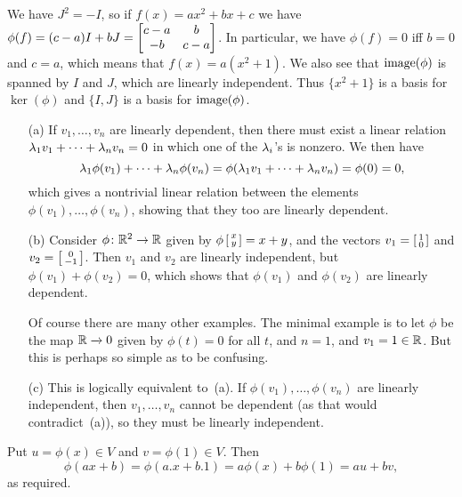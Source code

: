  We have $J^2=-I$, so if $f(x)=ax^2+bx+c$ we have
 $\phi(f)=(c-a)I+bJ=\left[\begin{matrix} c-a&b\\-b&c-a\end{matrix}\right]$.  In particular,
 we have $\phi(f)=0$ iff $b=0$ and $c=a$, which means that
 $f(x)=a(x^2+1)$.  We also see that $\operatorname{image}(\phi)$ is spanned
 by $I$ and $J$, which are linearly independent.  Thus
 $\{x^2+1\}$ is a basis for $\ker(\phi)$ and $\{I,J\}$ is a
 basis for $\operatorname{image}(\phi)$.
\EndDeferredSolution

 \begin{itemize}
  \item[(a)] If $v_1,\dotsc,v_n$ are linearly dependent,
   then there must exist a linear relation
   $\lambda_1v_1+\dotsb+\lambda_nv_n=0$ in which one of the
   $\lambda_i$'s is nonzero.  We then have
   \[ \lambda_1\phi(v_1)+\dotsb+\lambda_n\phi(v_n) =
      \phi(\lambda_1v_1+\dotsb+\lambda_nv_n) = \phi(0) = 0,
   \]
   which gives a nontrivial linear relation between the
   elements $\phi(v_1),\dotsc,\phi(v_n)$, showing that they
   too are linearly dependent.
  \item[(b)] Consider $\phi\colon{\mathbb{R}}^2\to{\mathbb{R}}$ given by
   $\phi\left[\begin{smallmatrix} x\\ y\end{smallmatrix}\right]=x+y$, and the vectors
   $v_1=\left[\begin{smallmatrix} 1\\0\end{smallmatrix}\right]$ and $v_2=\left[\begin{smallmatrix} 0\\-1\end{smallmatrix}\right]$.  Then $v_1$
   and $v_2$ are linearly independent, but
   $\phi(v_1)+\phi(v_2)=0$, which shows that $\phi(v_1)$ and
   $\phi(v_2)$ are linearly dependent.

   Of course there are many other examples.  The minimal
   example is to let $\phi$ be the map ${\mathbb{R}}\xrightarrow{}0$ given by
   $\phi(t)=0$ for all $t$, and $n=1$, and $v_1=1\in{\mathbb{R}}$.
   But this is perhaps so simple as to be confusing.
  \item[(c)] This is logically equivalent to~(a).  If
   $\phi(v_1),\dotsc,\phi(v_n)$ are linearly independent,
   then $v_1,\dotsc,v_n$ cannot be dependent (as that would
   contradict~(a)), so they must be linearly independent.
 \end{itemize}
\EndDeferredSolution

 Put $u=\phi(x)\in V$ and $v=\phi(1)\in V$.  Then
 \[ \phi(ax+b) = \phi(a.x+b.1) = a\phi(x)+b\phi(1)
     = au+bv,
 \]
 as required.
\EndDeferredSolution

